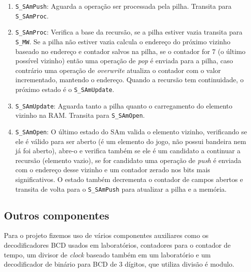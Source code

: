 \documentclass[12pt]{article}
\begin{document}
\begin{enumerate}

\item \verb|S_SAmPush|: Aguarda a operação ser processada pela pilha. Transita
	para \verb|S_SAmProc|.
	
\item \verb|S_SAmProc|: Verifica a base da recursão, se a pilha estiver vazia
	transita para \verb|S_MW|. Se a pilha não estiver vazia calcula o endereço
	do próximo vizinho baseado no endereço e contador salvos na pilha, se o
	contador for 7 (o último possível vizinho) então uma operação de \emph{pop}
	é enviada para a pilha, caso contrário uma operação de \emph{overwrite}
	atualiza o contador com o valor incrementado, mantendo o endereço. Quando a
	recursão tem continuidade, o próximo estado é o \verb|S_SAmUpdate|.
	
\item \verb|S_SAmUpdate|: Aguarda tanto a pilha quanto o carregamento do 
	elemento vizinho na RAM. Transita para \verb|S_SAmOpen|.
	
\item \verb|S_SAmOpen|: O último estado do SAm valida o elemento vizinho,
	verificando se ele é válido para ser aberto (é um elemento do jogo, não
	possui bandeira nem já foi aberto), abre-o e verifica também se ele é um
	candidato a continuar a recursão (elemento vazio), se for candidato uma
	operação de \emph{push} é enviada com o endereço desse vizinho e um
	contador zerado nos bits mais significativos. O estado também decrementa o
	contador de campos abertos e transita de volta para o \verb|S_SAmPush| para 
	atualizar a pilha e a memória.

\end{enumerate}


\subsection{Outros componentes}
\label{sec:others}

Para o projeto fizemos uso de vários componentes auxiliares como os 
decodificadores BCD usados em laboratórios, contadores para o contador de
tempo, um divisor de \emph{clock} baseado também em um laboratório e um 
decodificador de binário para BCD de 3 dígitos, que utiliza divisão é modulo.

\end{document}
